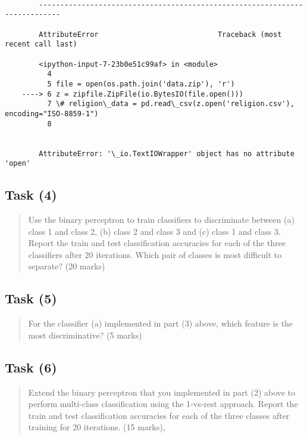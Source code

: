 \documentclass[11pt]{article}
\begin{document}
    \begin{Verbatim}[commandchars=\\\{\}]

        ---------------------------------------------------------------------------

        AttributeError                            Traceback (most recent call last)

        <ipython-input-7-23b0e51c99af> in <module>
          4 
          5 file = open(os.path.join('data.zip'), 'r')
    ----> 6 z = zipfile.ZipFile(io.BytesIO(file.open()))
          7 \# religion\_data = pd.read\_csv(z.open('religion.csv'), encoding="ISO-8859-1")
          8 
    

        AttributeError: '\_io.TextIOWrapper' object has no attribute 'open'

    \end{Verbatim}

    \hypertarget{task-4}{%
\subsection{Task (4)}\label{task-4}}

\begin{quote}
Use the binary perceptron to train classifiers to discriminate between
(a) class 1 and class 2, (b) class 2 and class 3 and (c) class 1 and
class 3. Report the train and test classification accuracies for each of
the three classifiers after 20 iterations. Which pair of classes is most
difficult to separate? (20 marks)
\end{quote}

    \hypertarget{task-5}{%
\subsection{Task (5)}\label{task-5}}

\begin{quote}
For the classifier (a) implemented in part (3) above, which feature is
the most discriminative? (5 marks)
\end{quote}

    \hypertarget{task-6}{%
\subsection{Task (6)}\label{task-6}}

\begin{quote}
Extend the binary perceptron that you implemented in part (2) above to
perform multi-class classification using the 1-vs-rest approach. Report
the train and test classification accuracies for each of the three
classes after training for 20 iterations. (15 marks),
\end{quote}
\end{document}
